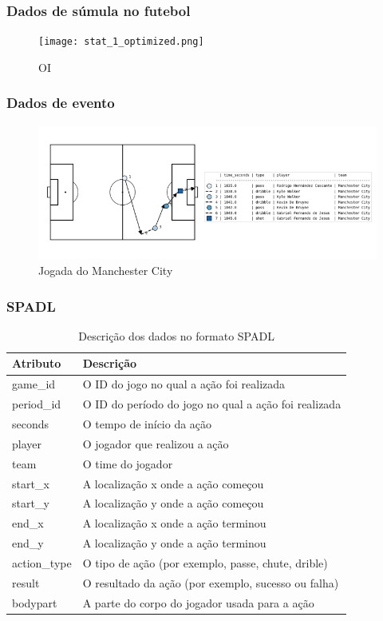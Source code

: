 \documentclass{beamer}
\begin{document}
\begin{frame}
\frametitle{Dados de súmula no futebol}
\begin{figure}[H]
\centering
\texttt{[image: stat\_1\_optimized.png]}
\caption{OI}
\end{figure}
\end{frame}

\begin{frame}
\frametitle{Dados de evento}
\begin{figure}[H]
\centering
\includegraphics[width=\linewidth]{eventdatacity.png}
\caption{Jogada do Manchester City}
\end{figure}
\end{frame}

\begin{frame}
\frametitle{SPADL}
\begin{table}[H]
\centering
\begin{tabular}{|l|l|}
\hline
\textbf{Atributo} & \textbf{Descrição} \\
\hline
game\_id & O ID do jogo no qual a ação foi realizada \\
\hline
period\_id & O ID do período do jogo no qual a ação foi realizada \\
\hline
seconds & O tempo de início da ação \\
\hline
player & O jogador que realizou a ação \\
\hline
team & O time do jogador \\
\hline
start\_x & A localização x onde a ação começou \\
\hline
start\_y & A localização y onde a ação começou \\
\hline
end\_x & A localização x onde a ação terminou \\
\hline
end\_y & A localização y onde a ação terminou \\
\hline
action\_type & O tipo de ação (por exemplo, passe, chute, drible) \\
\hline
result & O resultado da ação (por exemplo, sucesso ou falha) \\
\hline
bodypart & A parte do corpo do jogador usada para a ação \\
\hline
\end{tabular}
\caption{Descrição dos dados no formato SPADL}
\end{table}
\end{frame}
\end{document}

